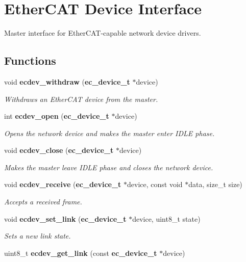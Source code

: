 \section{Ether\-C\-A\-T Device Interface}
\label{group__DeviceInterface}


Master interface for Ether\-C\-A\-T-\/capable network device drivers.  


\subsection*{Functions}
\begin{DoxyCompactItemize}
\item 
void {\bf ecdev\-\_\-withdraw} ({\bf ec\-\_\-device\-\_\-t} $\ast$device)
\begin{DoxyCompactList}\small\item\em Withdraws an Ether\-C\-A\-T device from the master. \end{DoxyCompactList}\item 
int {\bf ecdev\-\_\-open} ({\bf ec\-\_\-device\-\_\-t} $\ast$device)
\begin{DoxyCompactList}\small\item\em Opens the network device and makes the master enter I\-D\-L\-E phase. \end{DoxyCompactList}\item 
void {\bf ecdev\-\_\-close} ({\bf ec\-\_\-device\-\_\-t} $\ast$device)
\begin{DoxyCompactList}\small\item\em Makes the master leave I\-D\-L\-E phase and closes the network device. \end{DoxyCompactList}\item 
void {\bf ecdev\-\_\-receive} ({\bf ec\-\_\-device\-\_\-t} $\ast$device, const void $\ast$data, size\-\_\-t size)
\begin{DoxyCompactList}\small\item\em Accepts a received frame. \end{DoxyCompactList}\item 
void {\bf ecdev\-\_\-set\-\_\-link} ({\bf ec\-\_\-device\-\_\-t} $\ast$device, uint8\-\_\-t state)
\begin{DoxyCompactList}\small\item\em Sets a new link state. \end{DoxyCompactList}\item 
uint8\-\_\-t {\bf ecdev\-\_\-get\-\_\-link} (const {\bf ec\-\_\-device\-\_\-t} $\ast$device)

\end{DoxyCompactItemize}
